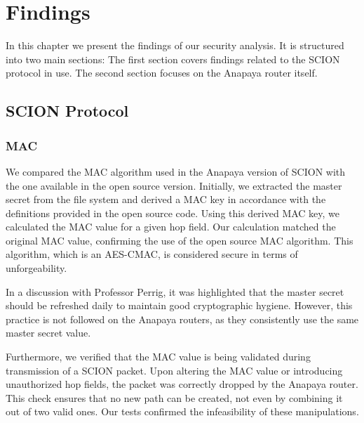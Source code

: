 \chapter{Findings}
\label{ch:findings}


In this chapter we present the findings of our security analysis.
It is structured into two main sections:
The first section covers findings related to the SCION protocol in use.
The second section focuses on the Anapaya router itself.

\section{SCION Protocol}



\subsection{MAC}
We compared the MAC algorithm used in the Anapaya version of SCION with the one available in the open source version.
Initially, we extracted the master secret from the file system and derived a MAC key in accordance with the definitions provided in the open source code.
Using this derived MAC key, we calculated the MAC value for a given hop field.
Our calculation matched the original MAC value, confirming the use of the open source MAC algorithm.
This algorithm, which is an AES-CMAC, is considered secure in terms of unforgeability.

In a discussion with Professor Perrig, it was highlighted that the master secret should be refreshed daily to maintain good cryptographic hygiene.
However, this practice is not followed on the Anapaya routers, as they consistently use the same master secret value.

Furthermore, we verified that the MAC value is being validated during transmission of a SCION packet.
Upon altering the MAC value or introducing unauthorized hop fields, the packet was correctly dropped by the Anapaya router.
This check ensures that no new path can be created, not even by combining it out of two valid ones.
Our tests confirmed the infeasibility of these manipulations.



